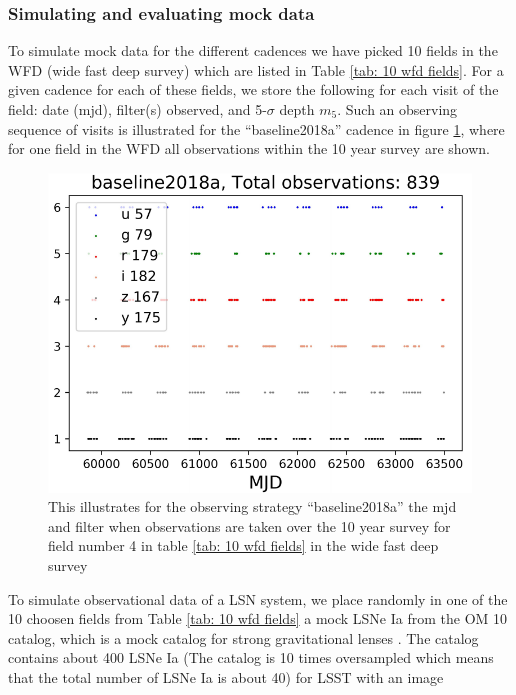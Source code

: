 \subsubsection{Simulating and evaluating mock data}
\label{sec:simulation of mock data}
To simulate mock data for the different cadences we have picked 10
fields in the WFD (wide fast deep survey) which are listed in Table
\ref{tab: 10 wfd fields}. For a given cadence for each of these
fields, we store the following for each visit of the field: date
(mjd), filter(s) observed, and 5-$\sigma$ depth $m_5$. Such an
observing sequence of visits is illustrated for the ``baseline2018a''
cadence in figure \ref{fig:observation patter LSST 10 year survey},
where for one field in the WFD all observations within the 10 year
survey are shown. 
%
\begin{figure}
\centering
\includegraphics[scale=0.7]{figures/sl_field_number3_baseline2018a_Daniel.pdf}
\caption{This illustrates for the observing strategy ``baseline2018a'' the mjd and filter when observations are taken over the 10 year survey for field number 4 in table \ref{tab: 10 wfd fields} in the wide fast deep survey}
\label{fig:observation patter LSST 10 year survey}
\end{figure}
%
To simulate observational data of a LSN system, we place randomly in
one of the 10 choosen fields from Table \ref{tab: 10 wfd fields} a
mock LSNe Ia from the OM 10 catalog, which is a mock catalog for
strong gravitational lenses \citep{Oguri:2010}. The catalog contains
about 400 LSNe Ia (The catalog is 10 times oversampled which means
that the total number of LSNe Ia is about 40) for LSST with an image
